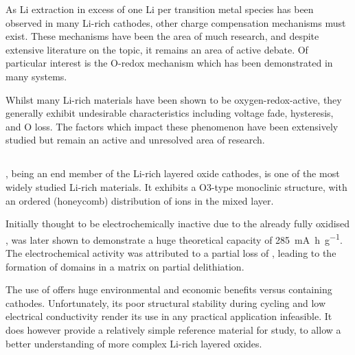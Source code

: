 As Li extraction in excess of one Li per transition metal species has been observed in many Li-rich cathodes, other charge compensation mechanisms must exist.
These mechanisms have been the area of much research, and despite extensive literature on the topic,\cite{Rozier2015,Csernica2019, Li2018a, Seo2016} it remains an area of active debate.
Of particular interest is the O-redox mechanism which has been demonstrated in many systems.\cite{Li2018a}

Whilst many Li-rich materials have been shown to be oxygen-redox-active, they generally exhibit undesirable characteristics including voltage fade, hysteresis, and O loss.\cite{Csernica2019}
The factors which impact these phenomenon have been extensively studied but remain an active and unresolved area of research.\cite{Rozier2015,Csernica2019, Li2018a, Seo2016}
\newpage
\subsection{}
, being an end member of the Li-rich layered oxide cathodes, is one of the most widely studied Li-rich materials.
It exhibits a O3-type monoclinic structure, with an ordered (honeycomb) distribution of  ions in the mixed  layer.\cite{Rozier2015}

Initially thought to be electrochemically inactive due to the already fully oxidised ,  was later shown to  demonstrate a huge theoretical capacity of \SI{285}{\milli\ampere\hour\per\gram}.\cite{Kuganathan2019a}
The electrochemical activity was attributed to a partial loss of , leading to the formation of  domains in a  matrix on partial delithiation.

The use of  offers huge environmental and economic benefits versus  containing cathodes.
Unfortunately, its poor structural stability during cycling and low electrical conductivity render its use in any practical application infeasible.
It does however provide a relatively simple reference material for study, to allow a better understanding of more complex Li-rich layered oxides.





